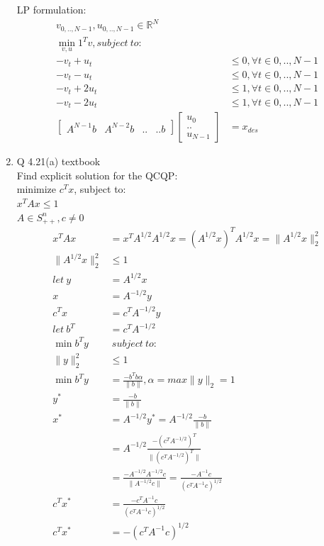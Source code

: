 \documentclass[12pt,letter]{article}
\newcommand{\R}{\mathbb{R}}
\newcommand{\norm}[1]{\|#1\|}
\begin{document}
\begin{enumerate}
  LP formulation:
  \begin{align*}
    v_{0,..,N-1},u_{0,..,N-1} \in \R^N\\
    \min_{v,u} 1^T v, subject\ to:\\
    -v_t + u_t & \leq 0, \forall t \in {0,..,N-1}\\
    - v_t -u_t & \leq 0, \forall t \in {0,..,N-1}\\
    -v_t + 2u_t & \leq 1, \forall t \in {0,..,N-1}\\
    -v_t - 2u_t & \leq 1, \forall t \in {0,..,N-1}\\
    \begin{bmatrix}
      A^{N-1}b & A^{N-2}b & .. & .. b
    \end{bmatrix}
    \begin{bmatrix}
      u_{0} \\ .. \\ u_{N-1}
    \end{bmatrix} & = x_{des}
  \end{align*}
\item Q 4.21(a) textbook\\
  Find explicit solution for the QCQP:\\
  minimize $c^T x$, subject to:\\
  $x^TAx \leq 1$\\
  $A \in S^n_{++}, c \neq 0$\\
  \begin{align*}
    x^TAx & = x^TA^{1/2}A^{1/2}x = (A^{1/2}x)^T A^{1/2}x = \norm{A^{1/2}x}_2^2\\
    \norm{A^{1/2}x}_2^2 & \leq 1\\
    let\ y &= A^{1/2}x\\
    x &= A^{-1/2}y\\
    c^T x &= c^T A^{-1/2}y\\
    let\ b^T &= c^T A^{-1/2}\\
    \min b^T y &\ subject\ to:\\
    \norm{y}_2^2 & \leq 1\\
    \min b^T y & = \frac{-b^Tb \alpha }{\norm{b}}, \alpha = max \norm{y}_2 = 1\\
    y^* & = \frac{-b}{\norm{b}}\\
    x^* &= A^{-1/2}y^* = A^{-1/2} \frac{-b}{\norm{b}}\\
          & = A^{-1/2} \frac{-(c^T A^{-1/2})^T}{\norm{(c^T A^{-1/2})^T}}\\
          & = \frac{-A^{-1/2}A^{-1/2}c}{\norm{A^{-1/2} c}} = \frac{-A^{-1}c}{(c^TA^{-1} c)^{1/2}}\\
    c^Tx^* &= \frac{-c^TA^{-1}c}{(c^TA^{-1} c)^{1/2}}\\
    c^Tx^* &= -(c^TA^{-1} c)^{1/2}
  \end{align*}


\end{enumerate}
\end{document}
